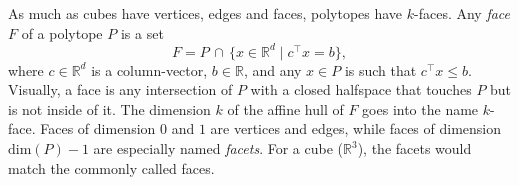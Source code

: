 


		As much as cubes have vertices, edges and faces, polytopes have $k$-faces. Any \emph{face} $F$ of a polytope $P$ is a set
		$$
			F = P \,\cap\, \{ x \in \mathbb{R}^d \mid c^\intercal x = b \} ,
		$$
		where $c \in \mathbb{R}^d$ is a column-vector, $b \in \mathbb{R}$, and any $x \in P$ is such that $c^\intercal x \leq b$. Visually, a face is any intersection of $P$ with a closed halfspace that touches $P$ but is not inside of it. The dimension $k$ of the affine hull of $F$ goes into the name $k$-face. Faces of dimension $0$ and $1$ are vertices and edges, while faces of dimension $\text{dim} (P) - 1$ are especially named \emph{facets}. For a cube ($\mathbb{R}^3$), the facets would match the commonly called faces.

